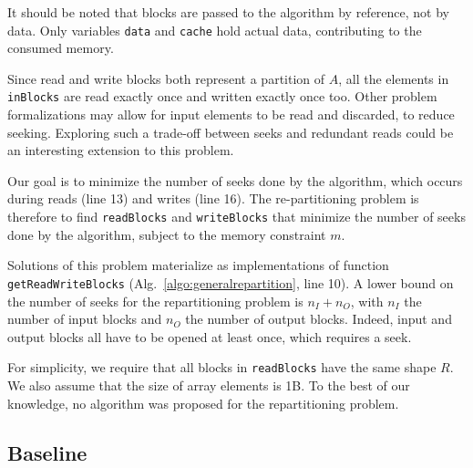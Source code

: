 \documentclass[sigconf, nonacm]{acmart}
\newcommand{\tristan}[1]{\fxnote{\small \color{red} \textbf{From Tristan:}#1} \color{black}}
\begin{document}
It should be noted that blocks are passed to the algorithm by reference,
not by data. Only variables \texttt{data} and \texttt{cache}
hold actual data, contributing to the consumed memory.

Since read and write blocks both represent a partition of $A$, all the
elements in \texttt{inBlocks} are read exactly once and written exactly once too. Other
problem formalizations may allow for input elements to be read and
discarded, to reduce seeking. Exploring such a trade-off
between seeks and redundant reads could be an interesting extension to this problem.

Our goal is to minimize the number of seeks done by the algorithm, which
occurs during reads (line 13) and writes (line 16). The re-partitioning
problem is therefore to find \texttt{readBlocks} and \texttt{writeBlocks} that
minimize the number of
seeks done by the algorithm, subject to the memory constraint $m$.


Solutions of this problem materialize as implementations of function
\texttt{getReadWriteBlocks} (Alg.~\ref{algo:generalrepartition}, line 10). A
lower bound on the number of seeks for the repartitioning problem is $n_I +
n_O$, with $n_I$ the number of input blocks and $n_O$ the number of output
blocks. Indeed, input and output blocks all have to be opened at least
once, which requires a seek.

For simplicity, we require that all blocks in \texttt{readBlocks} have the
same shape $R$. We also assume that the size of array elements is 1B. 
To the best of our knowledge, no algorithm was
proposed for the repartitioning problem.


\subsection{Baseline}
\end{document}
